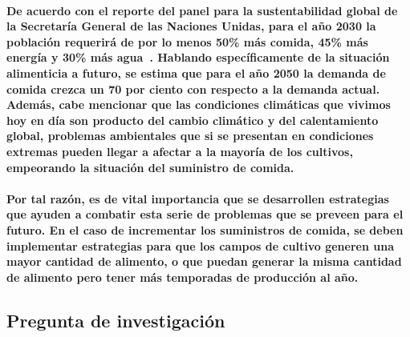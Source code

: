 \documentclass[10pt, twocolumn]{article}
\begin{document}
\paragraph{De acuerdo con el reporte del panel para la sustentabilidad global de la Secretaría General de las Naciones Unidas, para el año 2030 la población requerirá de por lo menos 50\% más comida, 45\% más energía y 30\% más agua~\cite{globalsustainabilityreport}. Hablando específicamente de la situación alimenticia a futuro, se estima que para el año 2050 la demanda de comida crezca un 70 por ciento con respecto a la demanda actual. \\ Además, cabe mencionar que las condiciones climáticas que vivimos hoy en día son producto del cambio climático y del calentamiento global, problemas ambientales que si se presentan en condiciones extremas pueden llegar a afectar a la mayoría de los cultivos, empeorando la situación del suministro de comida.}

\paragraph{Por tal razón, es de vital importancia que se desarrollen estrategias que ayuden a combatir esta serie de problemas que se preveen para el futuro. En el caso de incrementar los suministros de comida, se deben implementar estrategias para que los campos de cultivo generen una mayor cantidad de alimento, o que puedan generar la misma cantidad de alimento pero tener más temporadas de producción al año.}


\subsection{Pregunta de investigación}
\end{document}
